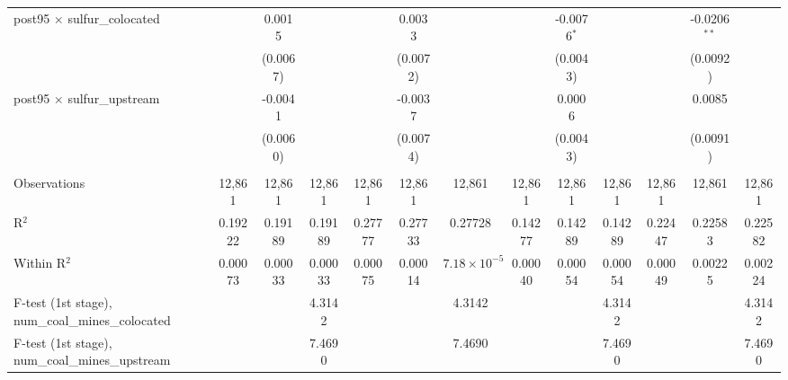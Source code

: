 \begin{table}[htbp]
\begin{adjustbox}{width = \textwidth, center}
\begin{tabular}{lcccccccccccc}
         post95 $\times$ sulfur\_colocated                  &               & 0.0015        &               &               & 0.0033        &                       &               & -0.0076$^{*}$ &               &               & -0.0206$^{**}$ &   \\   
                                                            &               & (0.0067)      &               &               & (0.0072)      &                       &               & (0.0043)      &               &               & (0.0092)       &   \\   
         post95 $\times$ sulfur\_upstream                   &               & -0.0041       &               &               & -0.0037       &                       &               & 0.0006        &               &               & 0.0085         &   \\   
                                                            &               & (0.0060)      &               &               & (0.0074)      &                       &               & (0.0043)      &               &               & (0.0091)       &   \\   
          \\
         Observations                                       & 12,861        & 12,861        & 12,861        & 12,861        & 12,861        & 12,861                & 12,861        & 12,861        & 12,861        & 12,861        & 12,861         & 12,861\\  
         R$^2$                                              & 0.19222       & 0.19189       & 0.19189       & 0.27777       & 0.27733       & 0.27728               & 0.14277       & 0.14289       & 0.14289       & 0.22447       & 0.22583        & 0.22582\\  
         Within R$^2$                                       & 0.00073       & 0.00033       & 0.00033       & 0.00075       & 0.00014       & $7.18\times 10^{-5}$  & 0.00040       & 0.00054       & 0.00054       & 0.00049       & 0.00225        & 0.00224\\  
         F-test (1st stage), num\_coal\_mines\_colocated    &               &               & 4.3142        &               &               & 4.3142                &               &               & 4.3142        &               &                & 4.3142\\  
         F-test (1st stage), num\_coal\_mines\_upstream     &               &               & 7.4690        &               &               & 7.4690                &               &               & 7.4690        &               &                & 7.4690\\  

\end{tabular}
\end{adjustbox}
\end{table}
